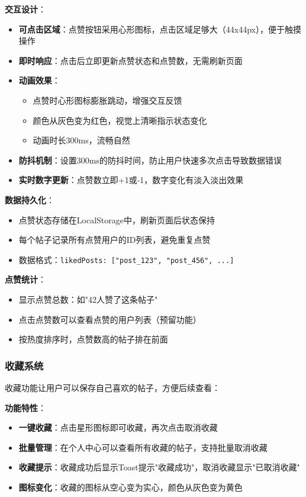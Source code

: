 \documentclass[12pt,a4paper]{article}
\begin{document}
\textbf{交互设计}：
\begin{itemize}
    \item \textbf{可点击区域}：点赞按钮采用心形图标，点击区域足够大（44x44px），便于触摸操作
    \item \textbf{即时响应}：点击后立即更新点赞状态和点赞数，无需刷新页面
    \item \textbf{动画效果}：
        \begin{itemize}
            \item 点赞时心形图标膨胀跳动，增强交互反馈
            \item 颜色从灰色变为红色，视觉上清晰指示状态变化
            \item 动画时长300ms，流畅自然
        \end{itemize}
    \item \textbf{防抖机制}：设置300ms的防抖时间，防止用户快速多次点击导致数据错误
    \item \textbf{实时数字更新}：点赞数立即+1或-1，数字变化有淡入淡出效果
\end{itemize}

\textbf{数据持久化}：
\begin{itemize}
    \item 点赞状态存储在LocalStorage中，刷新页面后状态保持
    \item 每个帖子记录所有点赞用户的ID列表，避免重复点赞
    \item 数据格式：\texttt{likedPosts: ["post\_123", "post\_456", ...]}
\end{itemize}

\textbf{点赞统计}：
\begin{itemize}
    \item 显示点赞总数：如"42人赞了这条帖子"
    \item 点击点赞数可以查看点赞的用户列表（预留功能）
    \item 按热度排序时，点赞数高的帖子排在前面
\end{itemize}

\subsubsection{收藏系统}

收藏功能让用户可以保存自己喜欢的帖子，方便后续查看：

\textbf{功能特性}：
\begin{itemize}
    \item \textbf{一键收藏}：点击星形图标即可收藏，再次点击取消收藏
    \item \textbf{批量管理}：在个人中心可以查看所有收藏的帖子，支持批量取消收藏
    \item \textbf{收藏提示}：收藏成功后显示Toast提示"收藏成功"，取消收藏显示"已取消收藏"
    \item \textbf{图标变化}：收藏的图标从空心变为实心，颜色从灰色变为黄色
\end{itemize}
\end{document}
